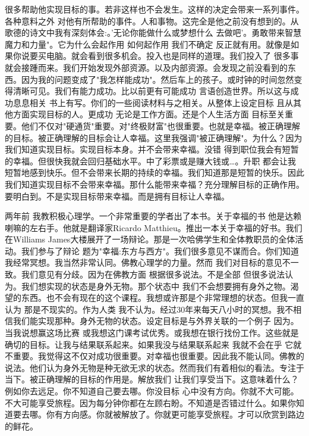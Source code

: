 很多帮助他实现目标的事。若非这样也不会发生。这样的决定会带来一系列事件。各种意料之外 对他有所帮助的事件。人和事物。这完全是他之前没有想到的。从歌德的诗文中我有深刻体会:。'无论你能做什么或梦想什么 去做吧'。勇敢带来智慧 魔力和力量"。它为什么会起作用 如何起作用 我们不确定 反正就有用。就像是如果你说要买电脑。就会看到很多机会。投入也是同样的道理。我们投入了 很多事就会接踵而来。我们开始发现外部资源。以及内部资源。会发现之前没看到的东西。因为我的问题变成了"我怎样能成功"。然后车上的孩子。或时钟的时间忽然变得清晰可见。我们有能力成功。比以前更有可能成功 言语创造世界。所以这与成功息息相关 书上有写。你们的一些阅读材料与之相关。从整体上设定目标 且从其他方面实现目标的人。更成功 无论是工作方面。还是个人生活方面 目标至关重要。他们不仅对"硬通货"重要。对"终极财富"也很重要。也就是幸福。被正确理解的目标。被正确理解的目标会让人幸福。这里我强调"被正确理解"。为什么？因为我们知道实现目标。实现目标本身。并不会带来幸福。没错 得到职位我会有短暂的幸福。但很快我就会回归基础水平。中了彩票或是赚大钱或…。升职 都会让我短暂地感到快乐。但不会带来长期的持续的幸福。我们知道那是短暂的快乐。因此我们知道实现目标不会带来幸福。那什么能带来幸福？充分理解目标的正确作用。要明白到。不是实现目标带来幸福。而是拥有目标让人幸福。 

两年前 我教积极心理学。一个非常重要的学者出了本书。关于幸福的书 他是达赖喇嘛的左右手。他就是翻译家Ricardo Matthieu。推出一本关于幸福的好书。我们在Williams James大楼展开了一场辩论。那是一次哈佛学生和全体教职员的全体活动。我们参与了辩论 题为"幸福:东方与西方"。我们很多意见不谋而合。你们知道 我经常冥想。我当然非常认同。佛教心理学的力量。然而 我们对目标的意见不一致。我们意见有分歧。因为在佛教方面 根据很多说法。不是全部 但很多说法认为。我们想实现的状态是身外无物。那个状态中 我们不会想要拥有身外之物。渴望的东西。也不会有现在的这个课程。我想或许那是个非常理想的状态。但我一直认为 那是不现实的。作为人类 我不认为。经过30年来每天八小时的冥想。我不相信我们能实现那种。身外无物的状态。设定目标是与外界关联的一个例子 因为。当我说想赢这场比赛 或我想这门课考试优秀。或我想在银行找份工作。这些就是确切的目标。让我与结果联系起来。如果我没与结果联系起来 我就不会在乎 它就不重要。我觉得这不仅对成功很重要。对幸福也很重要。因此我不能认同。佛教的说法。他们认为身外无物是种无欲无求的状态。然而我们有着相似的看法。专注于当下。被正确理解的目标的作用是。解放我们 让我们享受当下。这意味着什么？例如你去远足。你不知道自己要去哪。你没目标 心中没有方向。你就不大可能。不大可能享受旅程。因为每分钟你都在左顾右盼。不知道是否错过什么。如果你知道要去哪。你有方向感。你就被解放了。你就更可能享受旅程。才可以欣赏到路边的鲜花。 

